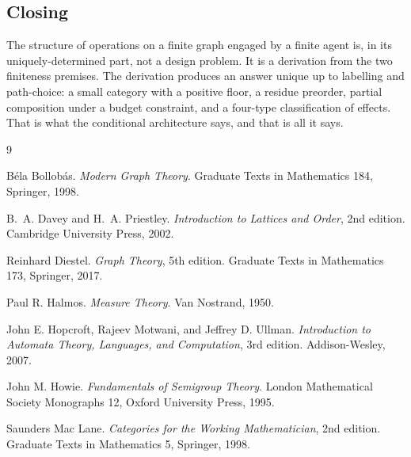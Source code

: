 \documentclass[11pt,a4paper]{article}
\theoremstyle{thmstyle}
\theoremstyle{definition}
\theoremstyle{remark}
\begin{document}
\subsection{Closing}

The structure of operations on a finite graph engaged by a finite
agent is, in its uniquely-determined part, not a design problem. It
is a derivation from the two finiteness premises. The derivation
produces an answer unique up to labelling and path-choice: a small
category with a positive floor, a residue preorder, partial
composition under a budget constraint, and a four-type
classification of effects. That is what the conditional
architecture says, and that is all it says.

\begin{thebibliography}{9}

 B\'ela Bollob\'as.
\emph{Modern Graph Theory}.
Graduate Texts in Mathematics 184, Springer, 1998.

B.~A. Davey and H.~A. Priestley.
\emph{Introduction to Lattices and Order}, 2nd edition.
Cambridge University Press, 2002.

 Reinhard Diestel.
\emph{Graph Theory}, 5th edition.
Graduate Texts in Mathematics 173, Springer, 2017.

 Paul R. Halmos.
\emph{Measure Theory}.
Van Nostrand, 1950.

John E. Hopcroft, Rajeev Motwani, and Jeffrey D. Ullman.
\emph{Introduction to Automata Theory, Languages, and Computation},
3rd edition. Addison-Wesley, 2007.

 John M. Howie.
\emph{Fundamentals of Semigroup Theory}.
London Mathematical Society Monographs 12, Oxford University Press,
1995.

 Saunders Mac Lane.
\emph{Categories for the Working Mathematician}, 2nd edition.
Graduate Texts in Mathematics 5, Springer, 1998.

\end{thebibliography}
\end{document}
